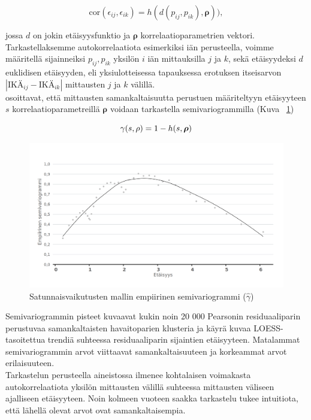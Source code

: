 \documentclass[finnish]{docopts}
\begin{document}
$$
\text{cor}(\epsilon_{ij}, \epsilon_{ik}) = h(d(p_{ij}, p_{ik}), \bm{\rho})),
$$

jossa $d$ on jokin etäisyysfunktio ja $\bm{\rho}$ korrelaatioparametrien vektori.\\

Tarkastellaksemme autokorrelaatiota esimerkiksi iän perusteella, voimme määritellä sijainneiksi $p_{ij}, p_{ik}$ yksilön $i$ iän mittauksilla $j$ ja $k$, sekä etäisyydeksi $d$ euklidisen etäisyyden, eli yksiulotteisessa tapauksessa erotuksen itseisarvon $|\text{IKÄ}_{ij} - \text{IKÄ}_{ik}|$ mittausten $j$ ja $k$ välillä.\\ 

\cite{pinheiro00} osoittavat, että mittausten samankaltaisuutta perustuen määriteltyyn etäisyyteen $s$ korrelaatioparametreillä $\bm{\rho}$ voidaan tarkastella semivariogrammilla (Kuva ~\ref{fig:lme2_vario})

$$
\gamma(s, \rho) = 1 - h(s, \bm{\rho})\\
$$

\begin{figure}[H]
\centering
  \includegraphics[scale=0.8]{kuvaajat/lme2_vario.png}
  \caption{Satunnaisvaikutusten mallin empiirinen semivariogrammi ($\hat{\gamma}$)}
  \label{fig:lme2_vario}
\end{figure}

Semivariogrammin pisteet kuvaavat kukin noin 20 000 Pearsonin residuaaliparin perustuvaa samankaltaisten havaitoparien klusteria ja käyrä kuvaa LOESS-tasoitettua trendiä suhteessa residuaaliparin sijaintien etäisyyteen. Matalammat semivariogrammin arvot viittaavat samankaltaisuuteen ja korkeammat arvot erilaisuuteen.\\

Tarkastelun perusteella aineistossa ilmenee kohtalaisen voimakasta autokorrelaatiota yksilön mittausten välillä suhteessa mittausten väliseen ajalliseen etäisyyteen. Noin kolmeen vuoteen saakka tarkastelu tukee intuitiota, että lähellä olevat arvot ovat samankaltaisempia.\\
\end{document}
